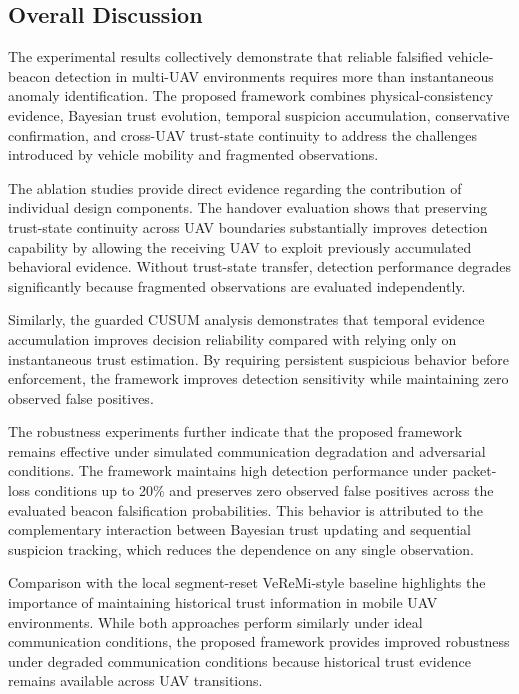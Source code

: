 \documentclass[journal]{IEEEtran}
\begin{document}
\subsection{Overall Discussion}
\label{subsec:overall_discussion}

The experimental results collectively demonstrate that reliable falsified
vehicle-beacon detection in multi-UAV environments requires more than
instantaneous anomaly identification. The proposed framework combines
physical-consistency evidence, Bayesian trust evolution, temporal suspicion
accumulation, conservative confirmation, and cross-UAV trust-state continuity
to address the challenges introduced by vehicle mobility and fragmented
observations.

The ablation studies provide direct evidence regarding the contribution of
individual design components. The handover evaluation shows that preserving
trust-state continuity across UAV boundaries substantially improves detection
capability by allowing the receiving UAV to exploit previously accumulated
behavioral evidence. Without trust-state transfer, detection performance
degrades significantly because fragmented observations are evaluated
independently.

Similarly, the guarded CUSUM analysis demonstrates that temporal evidence
accumulation improves decision reliability compared with relying only on
instantaneous trust estimation. By requiring persistent suspicious behavior
before enforcement, the framework improves detection sensitivity while
maintaining zero observed false positives.

The robustness experiments further indicate that the proposed framework
remains effective under simulated communication degradation and adversarial conditions.
The framework maintains high detection performance under packet-loss
conditions up to 20\% and preserves zero observed false positives across the evaluated
beacon falsification probabilities. This behavior is attributed to the complementary
interaction between Bayesian trust updating and sequential suspicion
tracking, which reduces the dependence on any single observation.

Comparison with the local segment-reset VeReMi-style baseline highlights the
importance of maintaining historical trust information in mobile UAV
environments. While both approaches perform similarly under ideal
communication conditions, the proposed framework provides improved robustness
under degraded communication conditions because historical trust evidence
remains available across UAV transitions.
\end{document}
